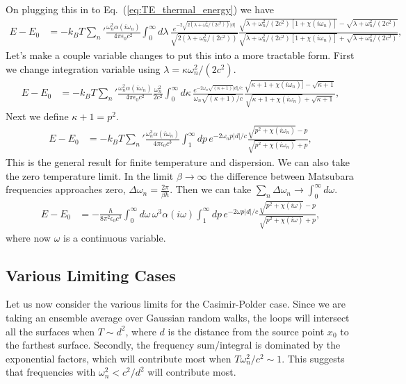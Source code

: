 On plugging this in to Eq.~(\ref{eq:TE_thermal_energy}) we have
\begin{align}
E-E_0&=-k_BT{\sum_n}'\frac{\omega_n^2\alpha(i\omega_n)}{4\pi\epsilon_0c^2}\int_0^\infty d\lambda\, 
\frac{e^{-2\sqrt{2(\lambda+\omega_n^2/(2c^2))}|d|}}{\sqrt{2(\lambda+\omega_n^2/(2c^2))}}
\frac{\sqrt{\lambda+\omega_n^2/(2c^2)[1+\chi(i\omega_n)]}-\sqrt{\lambda+\omega_n^2/(2c^2)}}
{\sqrt{\lambda+\omega_n^2/(2c^2)[1+\chi(i\omega_n)]}+\sqrt{\lambda+\omega_n^2/(2c^2)}},
\end{align}
Let's make a couple variable changes to put this into a more tractable form.  
First we change integration variable using $\lambda = \kappa \omega_n^2/(2c^2)$.  
\begin{align}
E-E_0&=-k_BT{\sum_n}'\frac{\omega_n^2\alpha(i\omega_n)}{4\pi\epsilon_0c^2}\frac{\omega_n^2}{2c^2}
\int_0^\infty d\kappa\, \frac{e^{-2\omega_n\sqrt{(\kappa+1)}|d|/c}}{\omega_n\sqrt{(\kappa+1)}/c}
\frac{\sqrt{\kappa+1+\chi(i\omega_n)]}-\sqrt{\kappa+1}}{\sqrt{\kappa+1+\chi(i\omega_n)}+\sqrt{\kappa+1}},
\end{align}
Next we define $\kappa +1= p^2$.  
\begin{align}
E-E_0&=-k_BT{\sum_n}'\frac{\omega_n^3\alpha(i\omega_n)}{4\pi\epsilon_0c^3}\int_1^\infty dp\,e^{-2\omega_n p|d|/c}
\frac{\sqrt{p^2+\chi(i\omega_n)}-p}{\sqrt{p^2+\chi(i\omega_n)}+p},
\label{eq:TE_CP_finite_temperature}
\end{align}
This is the general result for finite temperature and dispersion.
  We can also take the zero temperature limit.
  In the limit $\beta\rightarrow \infty$ the difference between Matsubara frequencies approaches zero,
 $\Delta\omega_n =\frac{2\pi}{\beta\hbar}$.  Then we can take $\sum_n\Delta\omega_n \rightarrow \int_0^\infty d\omega$.
\begin{align}
E-E_0&=-\frac{\hbar}{8\pi^2\epsilon_0c^3}\int_0^\infty d\omega\,\omega^3\alpha(i\omega)
\int_1^\infty dp\,e^{-2\omega p|d|/c}\frac{\sqrt{p^2+\chi(i\omega)}-p}{\sqrt{p^2+\chi(i\omega)}+p},\label{eq:TE_CP_zero_temperature}
\end{align}
where now $\omega$ is a continuous variable.  

\subsection{Various Limiting Cases}

Let us now consider the various limits for the Casimir-Polder case.
  Since we are taking an ensemble average over Gaussian random walks,
 the loops will intersect all the surfaces when $T\sim d^2$, 
where $d$ is the distance from the source point $x_0$ to the farthest surface.
  Secondly, the frequency sum/integral is dominated by the exponential factors,
 which will contribute most when $T\omega_n^2/c^2\sim 1$.
  This suggests that frequencies with  $\omega_n^2< c^2/d^2$  will contribute most.   

